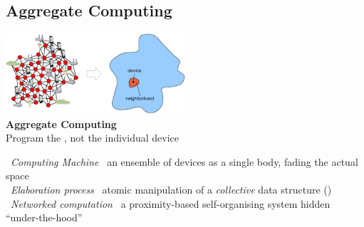 \documentclass[presentation, 8pt]{beamer}\mode<presentation>{\usetheme{AMSBolognaFC}}
\begin{document}
\subsection{Aggregate Computing}
\begin{frame}[c, plain]
\begin{center}

	\includegraphics[width=0.5\textwidth]{img/aggregate-computing-structure.png}\\
	{\Huge \textbf{Aggregate Computing}}\\
	{\large Program the , not the individual device} \\[0.2cm]
\end{center}
{\faCircle \, \normalsize{\emph{Computing Machine}} \faArrowRight \, an ensemble of devices as a single body, fading the actual space}\\
{\faCircle \, \normalsize{\emph{Elaboration process}} \faArrowRight \, atomic manipulation of a \emph{collective} data structure ()}\\
{\faCircle \, \normalsize{\emph{Networked computation}} \faArrowRight \,
a proximity-based self-organising system hidden ``under-the-hood''}
\end{frame}
\end{document}
